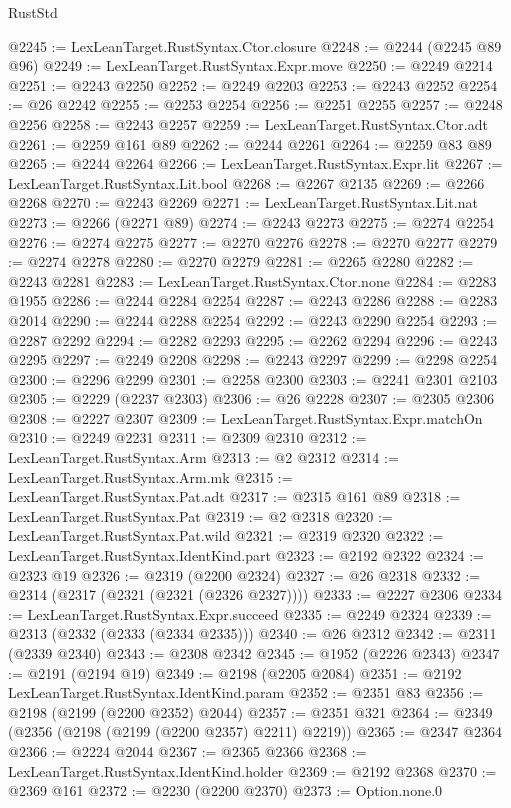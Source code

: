 \begin{lexlean}{RustStd}
\begin{coremodule}
{\begin{coremodule}
{{{{{{{{{{{{{{{{{{{{{{{{{{{{{{{{{{@2245 := LexLeanTarget.RustSyntax.Ctor.closure
@2248 := @2244 (@2245 @89 @96)
@2249 := LexLeanTarget.RustSyntax.Expr.move
@2250 := @2249 @2214
@2251 := @2243 @2250
@2252 := @2249 @2203
@2253 := @2243 @2252
@2254 := @26 @2242
@2255 := @2253 @2254
@2256 := @2251 @2255
@2257 := @2248 @2256
@2258 := @2243 @2257
@2259 := LexLeanTarget.RustSyntax.Ctor.adt
@2261 := @2259 @161 @89
@2262 := @2244 @2261
@2264 := @2259 @83 @89
@2265 := @2244 @2264
@2266 := LexLeanTarget.RustSyntax.Expr.lit
@2267 := LexLeanTarget.RustSyntax.Lit.bool
@2268 := @2267 @2135
@2269 := @2266 @2268
@2270 := @2243 @2269
@2271 := LexLeanTarget.RustSyntax.Lit.nat
@2273 := @2266 (@2271 @89)
@2274 := @2243 @2273
@2275 := @2274 @2254
@2276 := @2274 @2275
@2277 := @2270 @2276
@2278 := @2270 @2277
@2279 := @2274 @2278
@2280 := @2270 @2279
@2281 := @2265 @2280
@2282 := @2243 @2281
@2283 := LexLeanTarget.RustSyntax.Ctor.none
@2284 := @2283 @1955
@2286 := @2244 @2284 @2254
@2287 := @2243 @2286
@2288 := @2283 @2014
@2290 := @2244 @2288 @2254
@2292 := @2243 @2290 @2254
@2293 := @2287 @2292
@2294 := @2282 @2293
@2295 := @2262 @2294
@2296 := @2243 @2295
@2297 := @2249 @2208
@2298 := @2243 @2297
@2299 := @2298 @2254
@2300 := @2296 @2299
@2301 := @2258 @2300
@2303 := @2241 @2301 @2103
@2305 := @2229 (@2237 @2303)
@2306 := @26 @2228
@2307 := @2305 @2306
@2308 := @2227 @2307
@2309 := LexLeanTarget.RustSyntax.Expr.matchOn
@2310 := @2249 @2231
@2311 := @2309 @2310
@2312 := LexLeanTarget.RustSyntax.Arm
@2313 := @2 @2312
@2314 := LexLeanTarget.RustSyntax.Arm.mk
@2315 := LexLeanTarget.RustSyntax.Pat.adt
@2317 := @2315 @161 @89
@2318 := LexLeanTarget.RustSyntax.Pat
@2319 := @2 @2318
@2320 := LexLeanTarget.RustSyntax.Pat.wild
@2321 := @2319 @2320
@2322 := LexLeanTarget.RustSyntax.IdentKind.part
@2323 := @2192 @2322
@2324 := @2323 @19
@2326 := @2319 (@2200 @2324)
@2327 := @26 @2318
@2332 := @2314 (@2317 (@2321 (@2321 (@2326 @2327))))
@2333 := @2227 @2306
@2334 := LexLeanTarget.RustSyntax.Expr.succeed
@2335 := @2249 @2324
@2339 := @2313 (@2332 (@2333 (@2334 @2335)))
@2340 := @26 @2312
@2342 := @2311 (@2339 @2340)
@2343 := @2308 @2342
@2345 := @1952 (@2226 @2343)
@2347 := @2191 (@2194 @19)
@2349 := @2198 (@2205 @2084)
@2351 := @2192 LexLeanTarget.RustSyntax.IdentKind.param
@2352 := @2351 @83
@2356 := @2198 (@2199 (@2200 @2352) @2044)
@2357 := @2351 @321
@2364 := @2349 (@2356 (@2198 (@2199 (@2200 @2357) @2211) @2219))
@2365 := @2347 @2364
@2366 := @2224 @2044
@2367 := @2365 @2366
@2368 := LexLeanTarget.RustSyntax.IdentKind.holder
@2369 := @2192 @2368
@2370 := @2369 @161
@2372 := @2230 (@2200 @2370)
@2373 := Option.none.{0}
}}}}}}}}}}}}}}}}}}}}}}}}}}}}}}}}}}
\end{coremodule}}
\end{coremodule}
\end{lexlean}
